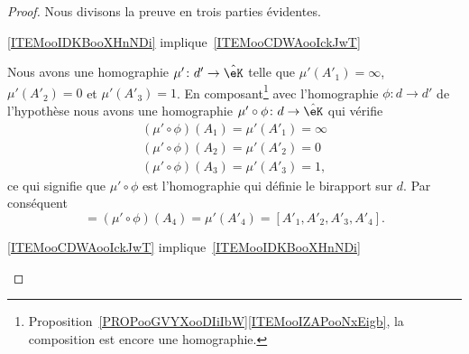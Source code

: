 \begin{proof}
    Nous divisons la preuve en trois parties évidentes.
    \begin{subproof}
        \item[\ref{ITEMooIDKBooXHnNDi} implique~\ref{ITEMooCDWAooIckJwT}]

            Nous avons une homographie \( \mu'\colon d'\to \hat\eK\) telle que \( \mu'(A'_1)=\infty\), \( \mu'(A'_2)=0\) et \( \mu'(A'_3)=1\). En composant\footnote{Proposition~\ref{PROPooGVYXooDIiIbW}\ref{ITEMooIZAPooNxEigb}, la composition est encore une homographie.} avec l'homographie \( \phi\colon d\to d'\) de l'hypothèse nous avons une homographie \( \mu'\circ \phi\colon d\to \hat\eK\) qui vérifie
            \begin{subequations}
                \begin{align}
                    (\mu'\circ\phi)(A_1)=\mu'(A'_1)=\infty\\
                    (\mu'\circ\phi)(A_2)=\mu'(A'_2)=0\\
                    (\mu'\circ\phi)(A_3)=\mu'(A'_3)=1,
                \end{align}
            \end{subequations}
            ce qui signifie que \( \mu'\circ\phi\) est l'homographie qui définie le birapport sur \( d\). Par conséquent
            \begin{equation}
                    [A_1,A_2,A_3,A_4]=(\mu'\circ \phi)(A_4)=\mu'(A'_4)=[A'_1,A'_2,A'_3,A'_4].
            \end{equation}
        \item[\ref{ITEMooCDWAooIckJwT} implique~\ref{ITEMooIDKBooXHnNDi}]


\end{subproof}
\end{proof}
